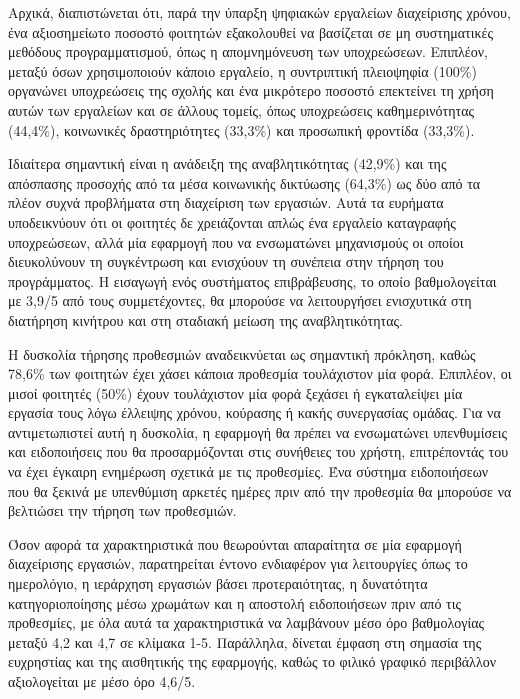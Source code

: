             Αρχικά, διαπιστώνεται ότι, παρά την ύπαρξη ψηφιακών εργαλείων διαχείρισης χρόνου, ένα αξιοσημείωτο ποσοστό φοιτητών εξακολουθεί να βασίζεται σε μη συστηματικές μεθόδους προγραμματισμού, όπως η απομνημόνευση των υποχρεώσεων. Επιπλέον, μεταξύ όσων χρησιμοποιούν κάποιο εργαλείο, η συντριπτική πλειοψηφία (100\%) οργανώνει υποχρεώσεις της σχολής και ένα μικρότερο ποσοστό επεκτείνει τη χρήση αυτών των εργαλείων και σε άλλους τομείς, όπως υποχρεώσεις καθημερινότητας (44,4\%), κοινωνικές δραστηριότητες (33,3\%) και προσωπική φροντίδα (33,3\%).

            Ιδιαίτερα σημαντική είναι η ανάδειξη της αναβλητικότητας (42,9\%) και της απόσπασης προσοχής από τα μέσα κοινωνικής δικτύωσης (64,3\%) ως δύο από τα πλέον συχνά προβλήματα στη διαχείριση των εργασιών. Αυτά τα ευρήματα υποδεικνύουν ότι οι φοιτητές δε χρειάζονται απλώς ένα εργαλείο καταγραφής υποχρεώσεων, αλλά μία εφαρμογή που να ενσωματώνει μηχανισμούς οι οποίοι διευκολύνουν τη συγκέντρωση και ενισχύουν τη συνέπεια στην τήρηση του προγράμματος. Η εισαγωγή ενός συστήματος επιβράβευσης, το οποίο βαθμολογείται με 3,9/5 από τους συμμετέχοντες, θα μπορούσε να λειτουργήσει ενισχυτικά στη διατήρηση κινήτρου και στη σταδιακή μείωση της αναβλητικότητας.

            Η δυσκολία τήρησης προθεσμιών αναδεικνύεται ως σημαντική πρόκληση, καθώς 78,6\% των φοιτητών έχει χάσει κάποια προθεσμία τουλάχιστον μία φορά. Επιπλέον, οι μισοί φοιτητές (50\%) έχουν τουλάχιστον μία φορά ξεχάσει ή εγκαταλείψει μία εργασία τους λόγω έλλειψης χρόνου, κούρασης ή κακής συνεργασίας ομάδας. Για να αντιμετωπιστεί αυτή η δυσκολία, η εφαρμογή θα πρέπει να ενσωματώνει υπενθυμίσεις και ειδοποιήσεις που θα προσαρμόζονται στις συνήθειες του χρήστη, επιτρέποντάς του να έχει έγκαιρη ενημέρωση σχετικά με τις προθεσμίες. Ένα σύστημα ειδοποιήσεων που θα ξεκινά με υπενθύμιση αρκετές ημέρες πριν από την προθεσμία θα μπορούσε να βελτιώσει την τήρηση των προθεσμιών.

            Όσον αφορά τα χαρακτηριστικά που θεωρούνται απαραίτητα σε μία εφαρμογή διαχείρισης εργασιών, παρατηρείται έντονο ενδιαφέρον για λειτουργίες όπως το ημερολόγιο, η ιεράρχηση εργασιών βάσει προτεραιότητας, η δυνατότητα κατηγοριοποίησης μέσω χρωμάτων και η αποστολή ειδοποιήσεων πριν από τις προθεσμίες, με όλα αυτά τα χαρακτηριστικά να λαμβάνουν μέσο όρο βαθμολογίας μεταξύ 4,2 και 4,7 σε κλίμακα 1-5. Παράλληλα, δίνεται έμφαση στη σημασία της ευχρηστίας και της αισθητικής της εφαρμογής, καθώς το φιλικό γραφικό περιβάλλον αξιολογείται με μέσο όρο 4,6/5.

